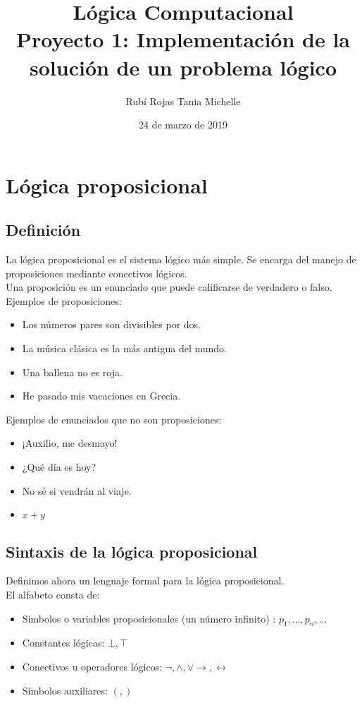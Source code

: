 \documentclass[letterpaper,11pt]{article}
\title{Lógica Computacional \\ 
Proyecto 1: Implementación de la solución de un problema lógico}
\author{Rubí Rojas Tania Michelle}
\date{24 de marzo de 2019}
\begin{document}
    \maketitle

    \section{Lógica proposicional}

    \subsection{Definición}
    La lógica proposicional es el sistema lógico más simple. Se encarga del 
    manejo de proposiciones mediante conectivos lógicos. \\
    Una proposición es un enunciado que puede calificarse de verdadero o falso.
    Ejemplos de proposiciones:
    \begin{itemize}
        \item Los números pares son divisibles por dos. 
        \item La música clásica es la más antigua del mundo.
        \item Una ballena no es roja.
        \item He pasado mis vacaciones en Grecia.
    \end{itemize}

    Ejemplos de enunciados que no son proposiciones:
    \begin{itemize}
        \item ¡Auxilio, me desmayo!
        \item ¿Qué día es hoy?
        \item No sé si vendrán al viaje.
        \item $x + y$
    \end{itemize}

    \subsection{Sintaxis de la lógica proposicional}
    Definimos ahora un lenguaje formal para la lógica proposicional. \\
    El alfabeto consta de:
    \begin{itemize}
        \item Símbolos o variables proposicionales (un número 
        infinito) : $p_{1}, ... , p_{n}, ...$
        \item Constantes lógicas: $\bot, \top$
        \item Conectivos u operadores lógicos: $\neg, \land, \lor 
        \rightarrow, \leftrightarrow$
        \item Símbolos auxiliares: $(,)$
    \end{itemize}
\end{document}
